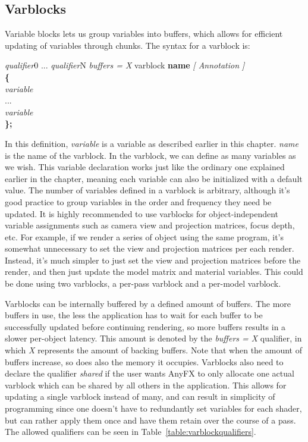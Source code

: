 \documentclass{article}
\newcommand{\SyntaxBox}[1]
{	
	\begin{center}
	\colorbox{orange!60}
	{
		\begin{minipage}{\linewidth}
		\hfill
		\begin{tabbing}
		#1
		\end{tabbing}
		\end{minipage}
	}
	\end{center}
}
\begin{document}
\subsection{Varblocks}
Variable blocks lets us group variables into buffers, which allows for efficient updating of variables through chunks. The syntax for a varblock is:

\SyntaxBox
{
	\textit{qualifier}0 ... \textit{qualifier}N \textit{buffers = X} varblock \textbf{name} \textit{[ Annotation ]} \\
	\textbf{\{} \= \\
	\>	\textit{variable} \\
	\>	...	\\
	\>	\textit{variable} \\
	\textbf{\};}
}

In this definition, \textit{variable} is a variable as described earlier in this chapter. \textit{name} is the name of the varblock. In the varblock, we can define as many variables as we wish. This variable declaration works just like the ordinary one explained earlier in the chapter, meaning each variable can also be initialized with a default value. The number of variables defined in a varblock is arbitrary, although it's good practice to group variables in the order and frequency they need be updated. It is highly recommended to use varblocks for object-independent variable assignments such as camera view and projection matrices, focus depth, etc. For example, if we render a series of object using the same program, it's somewhat unnecessary to set the view and projection matrices per each render. Instead, it's much simpler to just set the view and projection matrices before the render, and then just update the model matrix and material variables. This could be done using two varblocks, a per-pass varblock and a per-model varblock. 

Varblocks can be internally buffered by a defined amount of buffers. The more buffers in use, the less the application has to wait for each buffer to be successfully updated before continuing rendering, so more buffers results in a slower per-object latency. This amount is denoted by the \textit{buffers = X} qualifier, in which \textit{X} represents the amount of backing buffers. Note that when the amount of buffers increase, so does also the memory it occupies. Varblocks also need to declare the qualifier \textit{shared} if the user wants AnyFX to only allocate one actual varblock which can be shared by all others in the application. This allows for updating a single varblock instead of many, and can result in simplicity of programming since one doesn't have to redundantly set variables for each shader, but can rather apply them once and have them retain over the course of a pass. The allowed qualifiers can be seen in Table~\ref{table:varblockqualifiers}.
\end{document}
